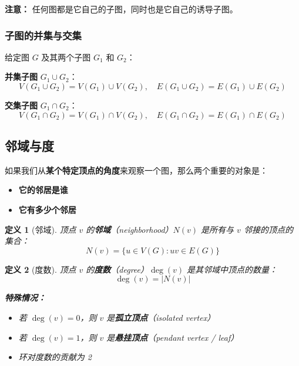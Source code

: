 \documentclass[12pt, a4paper]{article}
\newtheorem{definition}{定义}[section]
\begin{document}
\textbf{注意：} 任何图都是它自己的子图，同时也是它自己的诱导子图。

\subsubsection{子图的并集与交集}

给定图 $G$ 及其两个子图 $G_1$ 和 $G_2$：

\textbf{并集子图} $G_1 \cup G_2$：
\[
V(G_1 \cup G_2) = V(G_1) \cup V(G_2), \quad E(G_1 \cup G_2) = E(G_1) \cup E(G_2)
\]

\textbf{交集子图} $G_1 \cap G_2$：
\[
V(G_1 \cap G_2) = V(G_1) \cap V(G_2), \quad E(G_1 \cap G_2) = E(G_1) \cap E(G_2)
\]


\newpage
\subsection{邻域与度}

如果我们从\textbf{某个特定顶点的角度}来观察一个图，那么两个重要的对象是：
\begin{itemize}
    \item \textbf{它的邻居是谁}
    \item \textbf{它有多少个邻居}
\end{itemize}

\begin{definition}[邻域]
顶点 $v$ 的\textbf{邻域}（neighborhood）$N(v)$ 是所有与 $v$ 邻接的顶点的集合：
\[
N(v) = \{u \in V(G) : uv \in E(G)\}
\]
\end{definition}

\begin{definition}[度数]
顶点 $v$ 的\textbf{度数}（degree）$\deg(v)$ 是其邻域中顶点的数量：
\[
\deg(v) = |N(v)|
\]

\textbf{特殊情况：}
\begin{itemize}
    \item 若 $\deg(v) = 0$，则 $v$ 是\textbf{孤立顶点}（isolated vertex）
    \item 若 $\deg(v) = 1$，则 $v$ 是\textbf{悬挂顶点}（pendant vertex / leaf）
    \item 环对度数的贡献为 2
\end{itemize}
\end{definition}
\end{document}
